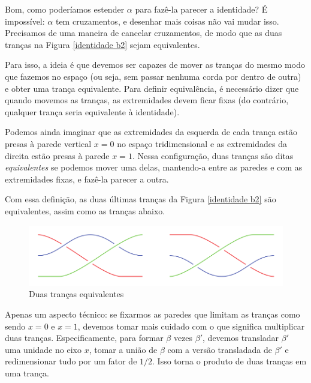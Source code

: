 	\par\vspace{0.3cm} Bom, como poderíamos estender $\alpha$ para fazê-la parecer a identidade? 
	É impossível: $\alpha$ tem cruzamentos, e desenhar mais coisas não vai mudar isso. Precisamos de uma 
	maneira de cancelar cruzamentos, de modo que as duas tranças na Figura \eqref{identidade b2} 
	sejam equivalentes. 
	
	\par\vspace{0.3cm} Para isso, a ideia é que devemos ser capazes de mover as tranças do mesmo modo que 
	fazemos no espaço (ou seja, sem passar nenhuma corda por dentro de outra) e obter uma trança equivalente. 
	Para definir equivalência, é necessário dizer que quando movemos as tranças, as extremidades devem ficar 
	fixas (do contrário, qualquer trança seria equivalente à identidade).
	
	\par\vspace{0.3cm} Podemos ainda imaginar que as extremidades da esquerda de cada trança estão presas 
	à parede vertical $x=0$ no espaço tridimensional e as extremidades da direita estão presas à parede $x=1$.
	Nessa configuração, duas tranças são ditas \textit{equivalentes} se podemos mover uma delas, mantendo-a 
	entre as paredes e com as extremidades fixas, e fazê-la parecer a outra. 
	
	\par\vspace{0.3cm} Com essa definição, as duas últimas tranças da Figura \eqref{identidade b2} 
	são equivalentes, assim como as tranças abaixo.
	\begin{figure}[H]
		\captionsetup{justification=centering}
		\begin{center}
			\includegraphics[width=12cm]{Images/fig_18_6.png}
		\end{center}\caption{Duas tranças equivalentes}\label{trancas equivalentes}
	\end{figure}   
	\par\vspace{0.3cm} Apenas um aspecto técnico: se fixarmos as paredes que limitam as tranças como 
	sendo $x = 0$ e $x=1$, devemos tomar mais cuidado com o que significa multiplicar duas tranças.
	Especificamente, para formar $\beta$ vezes $\beta'$, devemos transladar $\beta'$ uma unidade no eixo $x$, 
	tomar a união de $\beta$ com a versão transladada de $\beta'$ e redimensionar tudo por um fator de $1/2$. 
	Isso torna o produto de duas tranças em uma trança.
	

